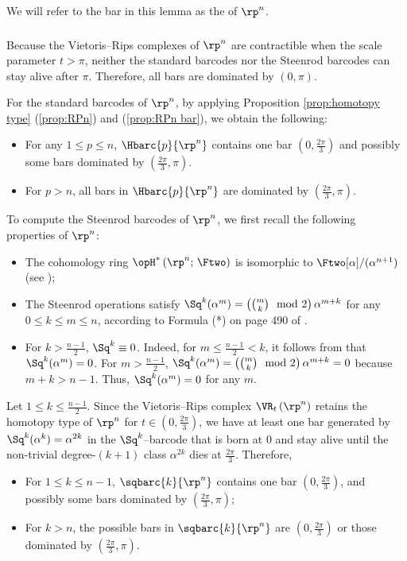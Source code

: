 We will refer to the bar in this lemma as the  of $\rp^n$.

\subsubsection{} Because the Vietoris--Rips complexes of $\rp^n$ are contractible when the scale parameter $t>\pi$, neither the standard barcodes nor the Steenrod barcodes can stay alive after $\pi$.
Therefore, all bars are dominated by $(0,\pi)$.

For the standard barcodes of $\rp^n$, by applying Proposition \ref{prop:homotopy type} (\ref{prop:RPn}) and (\ref{prop:RPn bar}), %
we obtain the following:
\begin{itemize}
	\item For any $1 \leq p \leq n$, $\Hbarc{p}{\rp^n}$ contains one bar $\left(0,\frac{2\pi}{3}\right)$ and possibly some bars  dominated by $\left(\frac{2\pi}{3}, \pi\right)$.
	\item For $p>n$, all bars in $\Hbarc{p}{\rp^n}$ are dominated by $\left(\frac{2\pi}{3},\pi\right)$.
\end{itemize}

To compute the Steenrod barcodes of $\rp^n$, we first recall the following properties of $\rp^n$:
\begin{itemize}
	\item The cohomology ring $\opH^*\left(\rp^n;\,\Ftwo\right)$ is isomorphic to $\Ftwo[\alpha]/(\alpha^{n+1})$ (see \cite[Theorem 3.19]{hatcher2000});
	\item The Steenrod operations satisfy $\Sq^k(\alpha^m)=\left({m \choose k} \mod 2\right)\alpha^{m+k}$ for any $0\leq k\leq m\leq n$, according to Formula (*) on page 490 of \cite{hatcher2000}.
	\item For $k>\frac{n-1}{2}$, $\Sq^k\equiv 0$.
	Indeed, for $m\leq \frac{n-1}{2}<k$, it follows from \cite[page 489, Item (5)]{hatcher2000} that $\Sq^k(\alpha^m)=0$.
	For $m> \frac{n-1}{2}$, $\Sq^k(\alpha^m)=\left({m \choose k} \mod 2\right)\alpha^{m+k}=0$ because $m+k>n-1.$ Thus, $\Sq^k(\alpha^m)=0$ for any $m$.
\end{itemize}

Let $1 \leq k \leq \frac{n-1}{2}$.
Since the Vietoris--Rips complex $\VR_t\left(\rp^n\right)$ retains the homotopy type of $\rp^n$ for $t\in \left(0,\frac{2\pi}{3}\right)$, we have at least one bar generated by $\Sq^k(\alpha^k)=\alpha^{2k}$ in the $\Sq^k$--barcode that is born at $0$ and stay alive until the non-trivial degree-$(k+1)$ class $\alpha^{2k}$ dies at $\frac{2\pi}{3}$.
Therefore,
\begin{itemize}
	\item For $1\leq k\leq n-1$, $\sqbarc{k}{\rp^n}$ contains one bar $\left(0,\frac{2\pi}{3}\right)$, and possibly some bars dominated by $\left(\frac{2\pi}{3},\pi\right)$;
	\item For $k>n$, the possible bars in $\sqbarc{k}{\rp^n}$ are $\left(0,\frac{2\pi}{3}\right)$ or those dominated by $\left(\frac{2\pi}{3},\pi\right)$.
\end{itemize}

